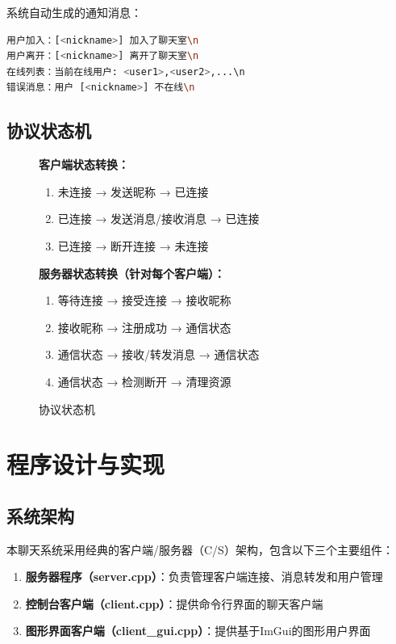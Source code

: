 \documentclass[12pt, a4paper]{article}
\begin{document}
系统自动生成的通知消息：

\begin{lstlisting}[language=bash]
用户加入：[<nickname>] 加入了聊天室\n
用户离开：[<nickname>] 离开了聊天室\n
在线列表：当前在线用户: <user1>,<user2>,...\n
错误消息：用户 [<nickname>] 不在线\n
\end{lstlisting}


\subsection*{协议状态机}

\begin{figure}[H]
    \centering
    \begin{tcolorbox}[width=0.9\textwidth]
    \textbf{客户端状态转换：}
    \begin{enumerate}[itemsep=2pt]
      \item 未连接 → 发送昵称 → 已连接
      \item 已连接 → 发送消息/接收消息 → 已连接
      \item 已连接 → 断开连接 → 未连接
    \end{enumerate}
    
    \vspace{5pt}
    \textbf{服务器状态转换（针对每个客户端）：}
    \begin{enumerate}[itemsep=2pt]
      \item 等待连接 → 接受连接 → 接收昵称
      \item 接收昵称 → 注册成功 → 通信状态
      \item 通信状态 → 接收/转发消息 → 通信状态
      \item 通信状态 → 检测断开 → 清理资源
    \end{enumerate}
    \end{tcolorbox}
    \caption{协议状态机}
\end{figure}

\section{程序设计与实现}

\subsection{系统架构}

本聊天系统采用经典的客户端/服务器（C/S）架构，包含以下三个主要组件：

\begin{enumerate}[itemsep=3pt]
  \item \textbf{服务器程序（server.cpp）}：负责管理客户端连接、消息转发和用户管理
  \item \textbf{控制台客户端（client.cpp）}：提供命令行界面的聊天客户端
  \item \textbf{图形界面客户端（client\_gui.cpp）}：提供基于ImGui的图形用户界面
\end{enumerate}
\end{document}
